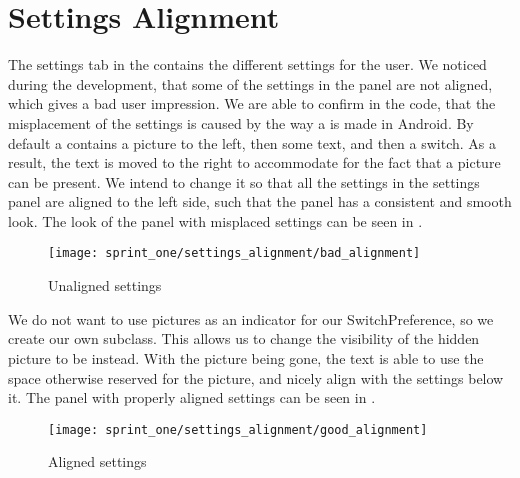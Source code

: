 \section{Settings Alignment}
\label{sec:settings_alignment}

The settings tab in the \launcher contains the different settings for the user. We noticed during the development, that some of the settings in the panel are not aligned, which gives a bad user impression. We are able to confirm in the code, that the misplacement of the settings is caused by the way a  is made in Android. By default a  contains a picture to the left, then some text, and then a switch. As a result, the text is moved to the right to accommodate for the fact that a picture can be present. We intend to change it so that all the settings in the settings panel are aligned to the left side, such that the panel has a consistent and smooth look. The look of the panel with misplaced settings can be seen in . \\

\begin{figure}[!htbp]
    \centering
    \texttt{[image: sprint\_one/settings\_alignment/bad\_alignment]}
    \caption{Unaligned settings}
    \label{fig:settings_alignment_bad}
\end{figure}

We do not want to use pictures as an indicator for our SwitchPreference, so we create our own  subclass. This allows us to change the visibility of the hidden picture to be  instead. With the picture being gone, the text is able to use the space otherwise reserved for the picture, and nicely align with the settings below it. The panel with properly aligned settings can be seen in . \\

\begin{figure}[!htbp]
    \centering
    \texttt{[image: sprint\_one/settings\_alignment/good\_alignment]}
    \caption{Aligned settings}
    \label{fig:settings_alignment_good}
\end{figure}